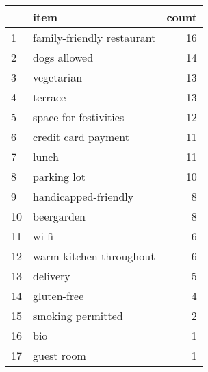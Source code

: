 \begin{tabular}{llr}
\toprule
{} &                       item &  count \\
\midrule
1  & family-friendly restaurant &     16 \\
2  &               dogs allowed &     14 \\
3  &                 vegetarian &     13 \\
4  &                    terrace &     13 \\
5  &      space for festivities &     12 \\
6  &        credit card payment &     11 \\
7  &                      lunch &     11 \\
8  &                parking lot &     10 \\
9  &       handicapped-friendly &      8 \\
10 &                 beergarden &      8 \\
11 &                      wi-fi &      6 \\
12 &    warm kitchen throughout &      6 \\
13 &                   delivery &      5 \\
14 &                gluten-free &      4 \\
15 &          smoking permitted &      2 \\
16 &                        bio &      1 \\
17 &                 guest room &      1 \\
\bottomrule
\end{tabular}
